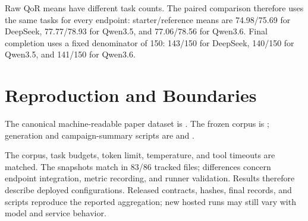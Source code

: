 Raw QoR means have different task counts. The paired comparison therefore
uses the same \CommonQorTaskCount{} tasks for every endpoint: starter/reference
means are 74.98/75.69 for DeepSeek, 77.77/78.93 for Qwen3.5, and
77.06/78.56 for Qwen3.6. Final completion uses a fixed denominator of 150:
143/150 for DeepSeek, 140/150 for Qwen3.5, and 141/150 for Qwen3.6.

\section{Reproduction and Boundaries}
\label{app:reproduction}

The canonical machine-readable paper dataset is
.
The frozen corpus is ; generation and
campaign-summary scripts are  and
.

The corpus, task budgets, token limit, temperature, and tool timeouts are
matched. The snapshots match in 83/86 tracked files; differences concern
endpoint integration, metric recording, and runner validation. Results
therefore describe deployed configurations. Released contracts, hashes, final
records, and scripts reproduce the reported aggregation; new hosted runs may
still vary with model and service behavior.
